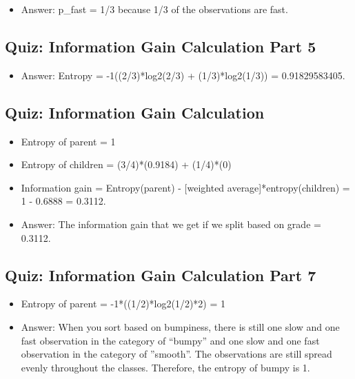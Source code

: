 \documentclass[12pt]{report}
\begin{document}
\begin{itemize}

\item Answer: p\_fast = 1/3 because 1/3 of the observations are fast.  

\end{itemize}

\subsection{Quiz: Information Gain Calculation Part 5}

\begin{itemize}

\item Answer: Entropy = -1((2/3)*log2(2/3) + (1/3)*log2(1/3)) = 0.91829583405. 

\end{itemize}

\subsection{Quiz: Information Gain Calculation}

\begin{itemize}

\item Entropy of parent = 1

\item Entropy of children = (3/4)*(0.9184) + (1/4)*(0)

\item Information gain = Entropy(parent) - [weighted average]*entropy(children) = 1 - 0.6888 = 0.3112.

\item Answer: The information gain that we get if we split based on grade = 0.3112. 

\end{itemize}

\subsection{Quiz: Information Gain Calculation Part 7}

\begin{itemize}

\item Entropy of parent = -1*((1/2)*log2(1/2)*2) = 1

\item Answer: When you sort based on bumpiness, there is still one slow and one fast observation in the category of ``bumpy'' and one slow and one fast observation in the category of ''smooth''. The observations are still spread evenly throughout the classes. Therefore, the entropy of bumpy is 1. 

\end{itemize}
\end{document}
